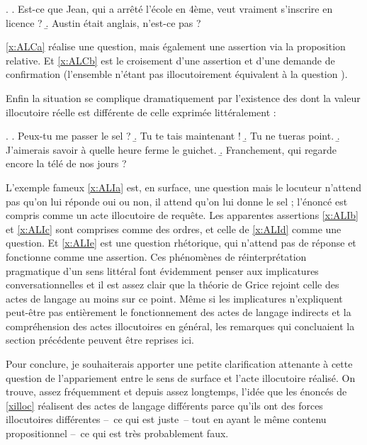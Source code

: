 \begin{refsegment}
\fussy

\ex.
\a.  Est-ce que Jean, qui a arrêté l'école en 4ème, veut vraiment s'inscrire en licence ? \label{x:ALCa}
\b. Austin était anglais, n'est-ce pas ? \label{x:ALCb}

\ref{x:ALCa} réalise une question, mais également une assertion via la proposition relative. Et \ref{x:ALCb} est le croisement d'une assertion et d'une demande de confirmation (l'ensemble n'étant pas illocutoirement équivalent à la question ).

Enfin la situation se complique dramatiquement par l'existence des  dont la valeur illocutoire réelle est différente de celle exprimée littéralement :



\ex. \label{x:ALI}
\a. Peux-tu me passer le sel ?  \label{x:ALIa}
\b. Tu te tais maintenant ! \label{x:ALIb}
\b. Tu ne tueras point. \label{x:ALIc}
\b. J'aimerais savoir à quelle heure ferme le guichet. \label{x:ALId}
\b. Franchement, qui regarde encore la télé de nos jours ? \label{x:ALIe}


L'exemple fameux \ref{x:ALIa} est, en surface, une question mais le locuteur n'attend pas qu'on lui réponde oui ou non, il attend qu'on lui donne le sel ; l'énoncé est compris comme un acte illocutoire de requête.  Les apparentes assertions \ref{x:ALIb} et \ref{x:ALIc} sont comprises comme des ordres, et celle de \ref{x:ALId} comme une question.  Et \ref{x:ALIe} est une question rhétorique, qui n'attend pas de réponse et fonctionne comme une assertion. Ces phénomènes de réinterprétation pragmatique d'un sens littéral font évidemment penser aux implicatures conversationnelles et il est assez clair que la théorie de Grice rejoint celle des actes de langage au moins sur ce point. 
Même si les implicatures n'expliquent peut-être pas entièrement le fonctionnement des actes de langage indirects et la compréhension des actes illocutoires en général, les remarques qui concluaient la section précédente peuvent être reprises ici.

Pour conclure, je souhaiterais apporter une petite clarification attenante à cette question de l'appariement entre le sens %
de surface et l'acte illocutoire réalisé.  
On trouve, assez fréquemment et depuis assez longtemps, l'idée que les énoncés de \ref{xilloc} réalisent des actes de langage différents parce qu'ils ont des forces illocutoires différentes --~ce qui est juste~-- tout en ayant le même contenu propositionnel --~ce qui est très probablement faux.



\end{refsegment}
